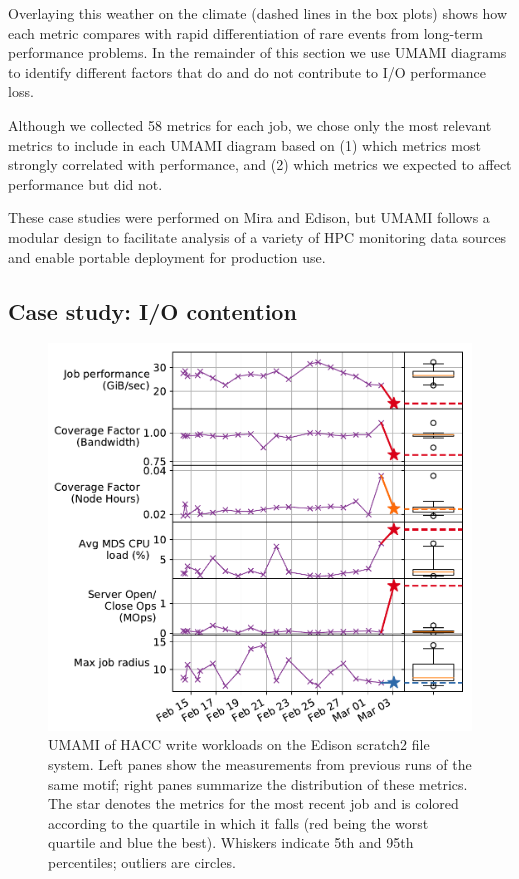 Overlaying this weather on the climate (dashed lines in the box plots) shows how each metric compares with  rapid differentiation of rare events from long-term performance problems.
In the remainder of this section we use UMAMI diagrams to identify different factors that do and do not contribute to I/O performance loss.
{Although we collected 58 metrics for each job, we chose only the most relevant metrics to include in each UMAMI diagram based on (1) which metrics most strongly correlated with performance, and (2) which metrics we expected to affect performance but did not.

These case studies were performed on Mira and Edison, but UMAMI
follows a modular design to facilitate analysis of a variety of HPC
monitoring data sources and enable portable deployment for production
use.

\subsection{Case study: I/O contention}

\begin{figure}[t]
    \centering
    \includegraphics[width=1.0\columnwidth]{figs/umami-scratch2-hacc-write.pdf}
    \vspace{-.25in}
    \caption{UMAMI of HACC write workloads on the Edison scratch2 file system.
    Left panes show the measurements from previous runs of the same motif; right panes summarize the distribution of these metrics.
    The star denotes the metrics for the most recent job and is colored according to the quartile in which it falls (red being the worst quartile and blue the best).
    Whiskers indicate 5th and 95th percentiles; outliers are circles.}
    \label{fig:umami-scratch2-hacc-write}
    \vspace{-.2in}
\end{figure}

}
